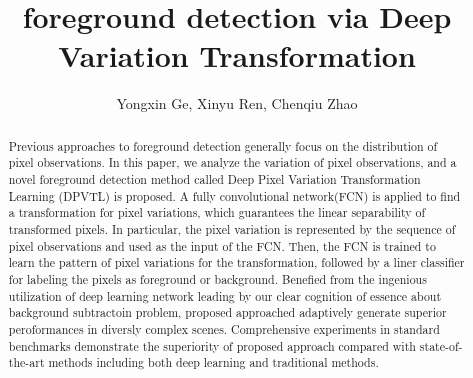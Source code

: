 \documentclass[journal]{IEEEtran}
\begin{document}
\title{foreground detection via Deep Variation Transformation}

\author{Yongxin Ge, 
        Xinyu Ren, 
        Chenqiu Zhao}



\maketitle



\begin{abstract}
%
Previous approaches to foreground detection generally focus on the distribution of pixel observations.
In this paper, we analyze the variation of pixel observations, and a novel foreground detection method called Deep Pixel Variation Transformation Learning (DPVTL) is proposed.
A fully convolutional network(FCN) is applied to find a transformation for pixel variations, which guarantees the linear separability of transformed pixels.
In particular,
the pixel variation is represented by the sequence of pixel observations and used as the input of the FCN.
Then, the FCN is trained to learn the pattern of pixel variations for the transformation, followed by a liner classifier for labeling the pixels as foreground or background.
%    
Benefied from the ingenious utilization of deep learning network leading by our clear cognition of essence about background subtractoin problem,
proposed approached adaptively generate superior peroformances in diversly complex scenes.
%
Comprehensive experiments in standard benchmarks demonstrate the superiority of proposed approach compared with state-of-the-art methods including both deep learning and traditional methods.
%
\end{abstract}
\end{document}
